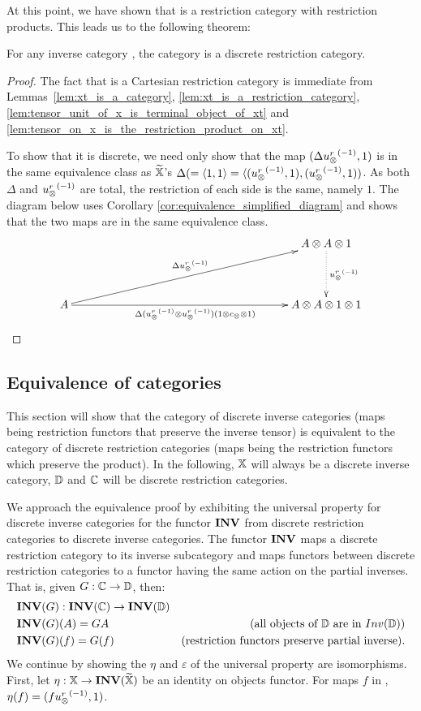 
At this point, we have shown that \Xt is a restriction category with restriction products. This
leads us to the following theorem:

\begin{theorem}\label{thm:xt_is_a_discrete_crc_when_x_is_an_inverse_category}
  For any inverse category \X, the category \Xt is a discrete restriction category.
\end{theorem}
\begin{proof}
  The fact that \Xt is a Cartesian restriction category is immediate from
  Lemmas~\ref{lem:xt_is_a_category}, \ref{lem:xt_is_a_restriction_category},
  \ref{lem:tensor_unit_of_x_is_terminal_object_of_xt} and
  \ref{lem:tensor_on_x_is_the_restriction_product_on_xt}.

  To show that it is discrete, we need only show that the map $(\Delta {\ensuremath{u_{\otimes}^r}}^{(-1)},1)$ is in the
  same equivalence class as $\widetilde{\mathbb{X}}$'s $\Delta(= \langle1,1\rangle = \langle({u_{\otimes}^r}^{(-1)},1),({u_{\otimes}^r}^{(-1)},1))$. As both
  $\Delta$ and ${u_{\otimes}^r}^{(-1)}$ are total, the restriction of each side is the same, namely $1$. The
  diagram below uses Corollary \ref{cor:equivalence_simplified_diagram} and shows that the two maps
  are in the same equivalence class.
  \[
    \xymatrix @C=190pt @R=40pt{
      & A \* A \* 1 \ar@{.>}[d]^{\inv{\usr}}\\
      A \ar[ur]^{\Delta\inv{\usr}}
        \ar[r]_{\Delta(\inv{\usr}\*\inv{\usr})(1\*c_{\*}\*1)}& A\*A\*1\*1
    }
  \]
\end{proof}
\subsection{Equivalence of categories} %
\label{sub:equivalence_of_categories}

This section will show that the category of discrete inverse categories (maps being restriction
functors that preserve the inverse tensor) is equivalent to the category of discrete restriction
categories (maps being the restriction functors which preserve the product). In the following, $\mathbb{X}$
will always be a discrete inverse category, $\mathbb{D}$ and $\mathbb{C}$ will be discrete restriction categories.

We approach the equivalence proof by exhibiting the universal property for discrete inverse
categories for the functor $\mathbf{INV}$ from discrete restriction categories to discrete inverse
categories. The functor $\mathbf{INV}$ maps a discrete restriction category to its inverse subcategory and
maps functors between discrete restriction categories to a functor having the same action on the
partial inverses. That is, given $G:\mathbb{C} \to \mathbb{D}$, then:
\begin{align*}
  &\mathbf{INV}({G}): \mathbf{INV}({\mathbb{C}}) \to \mathbf{INV}({\mathbb{D}})\\
  &\mathbf{INV}({G})(A) = G{A}&\text{(all objects of $\mathbb{D}$ are in $Inv(\mathbb{D})$)}\\
  &\mathbf{INV}({G})(f) = G(f)&\text{(restriction functors preserve partial inverse)}.
\end{align*}
We continue by showing the $\eta$ and $\varepsilon$ of the universal property are isomorphisms.
First, let $\eta:\mathbb{X} \to \mathbf{INV}({\widetilde{\mathbb{X}}})$ be an identity on objects functor. For maps $f$ in \X, $\eta(f)
= (f{u_{\otimes}^r}^{(-1)},1)$.

